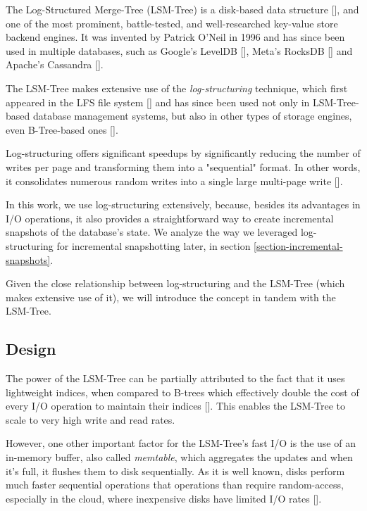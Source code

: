 
The Log-Structured Merge-Tree (LSM-Tree) is a disk-based data structure [\cite{lsmtree}], and one of the most prominent, battle-tested, and well-researched key-value store backend engines.
It was invented by Patrick O'Neil in 1996 and has since been used in multiple databases, such as Google's LevelDB [\cite{leveldb}], Meta's RocksDB [\cite{rocksdb}] and Apache's Cassandra [\cite{cassandra}].

The LSM-Tree makes extensive use of the \textit{log-structuring} technique, which first appeared in the LFS file system [\cite{lsm-filesystem}] and has since been used not only in LSM-Tree-based database management systems, but also in other types of storage engines, even B-Tree-based ones [\cite{llama}].

Log-structuring offers significant speedups by significantly reducing the number of writes per page and transforming them into a "sequential" format.
In other words, it consolidates numerous random writes into a single large multi-page write [\cite{llama}].

In this work, we use log-structuring extensively, because, besides its advantages in I/O operations, it also provides a straightforward way to create incremental snapshots of the database's state.
We analyze the way we leveraged log-structuring for incremental snapshotting later, in section \ref{section-incremental-snapshots}.

Given the close relationship between log-structuring and the LSM-Tree (which makes extensive use of it), we will introduce the concept in tandem with the LSM-Tree.

\subsection{Design}
\label{subsection-lsm-design}

The power of the LSM-Tree can be partially attributed to the fact that it uses lightweight indices, when compared to B-trees which effectively double the cost of every I/O operation to maintain their indices [\cite{lsmtree}].
This enables the LSM-Tree to scale to very high write and read rates.

However, one other important factor for the LSM-Tree's fast I/O is the use of an in-memory buffer, also called \textit{memtable}, which aggregates the updates and when it's full, it flushes them to disk sequentially.
As it is well known, disks perform much faster sequential operations that operations than require random-access, especially in the cloud, where inexpensive disks have limited I/O rates [\cite{llama}].

